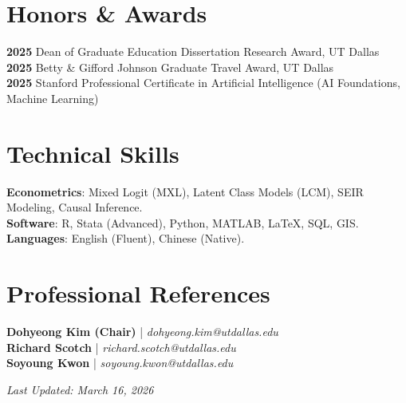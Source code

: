 \documentclass[11pt]{article}
\begin{document}
\section*{Honors \& Awards}
\textbf{2025} \quad Dean of Graduate Education Dissertation Research Award, UT Dallas \\
\textbf{2025} \quad Betty \& Gifford Johnson Graduate Travel Award, UT Dallas \\
\textbf{2025} \quad Stanford Professional Certificate in Artificial Intelligence (AI Foundations, Machine Learning)

\section*{Technical Skills}
\textbf{Econometrics}: Mixed Logit (MXL), Latent Class Models (LCM), SEIR Modeling, Causal Inference. \\
\textbf{Software}: R, Stata (Advanced), Python, MATLAB, LaTeX, SQL, GIS. \\
\textbf{Languages}: English (Fluent), Chinese (Native).

\section*{Professional References}
\textbf{Dohyeong Kim (Chair)} | \textit{dohyeong.kim@utdallas.edu} \\
\textbf{Richard Scotch} | \textit{richard.scotch@utdallas.edu} \\
\textbf{Soyoung Kwon} | \textit{soyoung.kwon@utdallas.edu}

\vspace{2em}
\begin{center}
    \textit{Last Updated: March 16, 2026}
\end{center}
\end{document}
